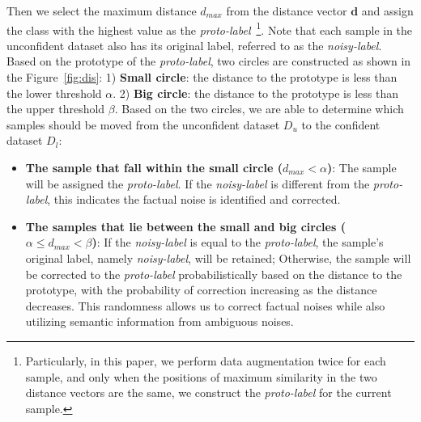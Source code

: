 \documentclass[letterpaper]{article} %
\begin{document}
Then we select the maximum distance $d_{max}$ from the distance vector $\bm{d}$ and assign the class with the highest value as the \textit{proto-label}~\footnote{Particularly, in this paper, we perform data augmentation twice for each sample, and only when the positions of maximum similarity in the two distance vectors are the same, we construct the \textit{proto-label} for the current sample.}. Note that each sample in the unconfident dataset also has its original label, referred to as the \textit{noisy-label}. Based on the prototype of the \textit{proto-label}, two circles are constructed as shown in the Figure~\ref{fig:dis}: 1) \textbf{Small circle}: the distance to the prototype is less than the lower threshold $\alpha$. 2) \textbf{Big circle}: the distance to the prototype is less than the upper threshold $\beta$. Based on the two circles, we are able to determine which samples should be moved from the unconfident dataset $D_u$ to the confident dataset $D_l$:
\begin{itemize}
    \item \textbf{The sample that fall within the small circle ($d_{max} < \alpha$)}: The sample will be assigned the \textit{proto-label}. If the \textit{noisy-label} is different from the \textit{proto-label}, this indicates the factual noise is identified and corrected.
    \item \textbf{The samples that lie between the small and big circles ( $\alpha 
    \leq d_{max} < \beta$)}: If the \textit{noisy-label} is equal to the \textit{proto-label}, the sample's original label, namely \textit{noisy-label}, will be retained; Otherwise, the sample will be corrected to the  \textit{proto-label} probabilistically based on the distance to the prototype, with the probability of correction increasing as the distance decreases. This randomness allows us to correct factual noises while also utilizing semantic information from ambiguous noises.
\end{itemize}


\end{document}
